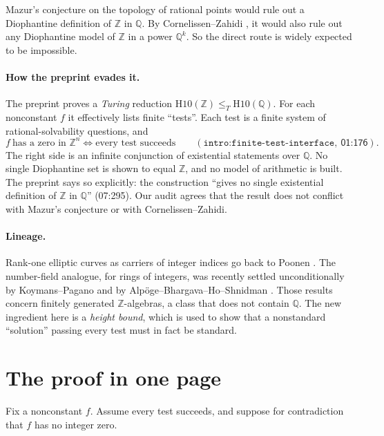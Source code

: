 \documentclass[11pt]{article}
\theoremstyle{definition}
\newcommand{\Q}{\mathbb Q}
\newcommand{\Z}{\mathbb Z}
\newcommand{\lbl}[1]{\texttt{#1}}
\newcommand{\src}[1]{\textsf{#1}}
\begin{document}
Mazur's conjecture on the topology of rational points \cite{Mazur1995}
would rule out a Diophantine definition of $\Z$ in $\Q$.  By
Cornelissen--Zahidi \cite[Thm.~3.6]{CornelissenZahidi2000}, it would also
rule out any Diophantine model of $\Z$ in a power $\Q^k$.  So the direct
route is widely expected to be impossible.

\paragraph{How the preprint evades it.}
The preprint proves a \emph{Turing} reduction
$\mathrm{H10}(\Z)\le_T\mathrm{H10}(\Q)$.  For each nonconstant $f$ it
effectively lists finite ``tests''.  Each test is a finite system of
rational-solvability questions, and
\[
 f\ \text{has a zero in }\Z^n
 \iff \text{every test succeeds}
 \qquad(\lbl{intro:finite-test-interface},\ \src{01:176}).
\]
The right side is an infinite conjunction of existential statements over
$\Q$.  No single Diophantine set is shown to equal $\Z$, and no model of
arithmetic is built.  The preprint says so explicitly: the construction
``gives no single existential definition of $\Z$ in $\Q$''
(\src{07:295}).  Our audit agrees that the result does not conflict with
Mazur's conjecture or with Cornelissen--Zahidi.

\paragraph{Lineage.}
Rank-one elliptic curves as carriers of integer indices go back to Poonen
\cite{PoonenRankOne2002,PoonenSubrings}.  The number-field analogue, for
rings of integers, was recently settled unconditionally by Koymans--Pagano
\cite{KoymansPagano2026} and by Alp\"oge--Bhargava--Ho--Shnidman
\cite{AlpogeBhargavaHoShnidman2026}.  Those results concern finitely
generated $\Z$-algebras, a class that does not contain $\Q$.  The new
ingredient here is a \emph{height bound}, which is used to show that a
nonstandard ``solution'' passing every test must in fact be standard.

\section{The proof in one page}\label{sec:onepage}

Fix a nonconstant $f$.  Assume every test succeeds, and suppose for
contradiction that $f$ has no integer zero.
\end{document}
